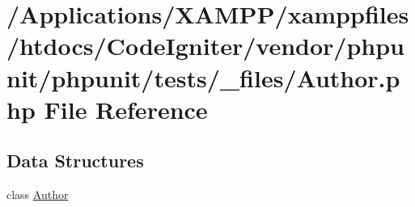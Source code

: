 \hypertarget{phpunit_2phpunit_2tests_2__files_2_author_8php}{}\section{/\+Applications/\+X\+A\+M\+P\+P/xamppfiles/htdocs/\+Code\+Igniter/vendor/phpunit/phpunit/tests/\+\_\+files/\+Author.php File Reference}
\label{phpunit_2phpunit_2tests_2__files_2_author_8php}
\subsection*{Data Structures}
\begin{DoxyCompactItemize}
\item 
class \mbox{\hyperlink{class_author}{Author}}
\end{DoxyCompactItemize}
